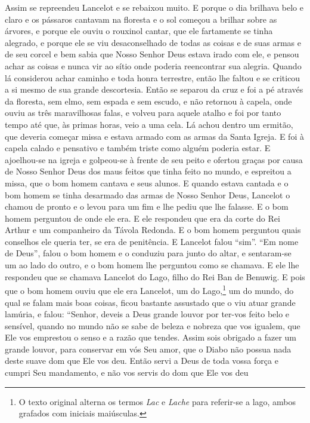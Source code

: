 Assim se repreendeu Lancelot e se rebaixou muito. E porque o dia brilhava belo
e claro e os pássaros cantavam na floresta e o sol começou a brilhar sobre as
árvores, e porque ele ouviu o rouxinol cantar, que ele fartamente se tinha
alegrado, e porque ele se viu desaconselhado de todas as coisas e de suas armas
e de seu corcel e bem sabia que Nosso Senhor Deus estava irado com ele, e
pensou achar as coisas e nunca vir ao sítio onde poderia reencontrar sua
alegria. Quando lá considerou achar caminho e toda honra terrestre,
então lhe faltou e se criticou a si mesmo de sua grande descortesia. 
Então se separou da cruz e foi a pé através da floresta, sem elmo, sem
espada e sem escudo, e não retornou à capela, onde ouviu as três maravilhosas
falas, e volveu para aquele atalho e foi por tanto tempo até que, às primas
horas, veio a uma cela. Lá achou dentro um ermitão, que deveria começar missa e
estava armado com as armas da Santa Igreja. E foi à capela calado e pensativo e
também triste como alguém poderia estar. E ajoelhou-se na igreja e golpeou-se à
frente de seu peito e ofertou graças por causa de Nosso Senhor Deus dos maus
feitos que tinha feito no mundo, e espreitou a missa, que o bom homem cantava e
seus alunos. E quando estava cantada e o bom homem se tinha desarmado das armas
de Nosso Senhor Deus, Lancelot o chamou de pronto e o levou para um fim e lhe
pediu que lhe falasse. E o bom homem perguntou de onde ele era. E ele respondeu
que era da corte do Rei Arthur e um companheiro da Távola Redonda. E o bom homem
perguntou quais conselhos ele queria ter, se era de penitência. E Lancelot
falou “sim”. “Em nome de Deus”, falou o bom homem e o conduziu para junto do
altar, e sentaram-se um ao lado do outro, e o bom homem lhe perguntou como se
chamava. E ele lhe respondeu que se chamava Lancelot do Lago, filho do Rei Ban
de Benuwig. E pois que o bom homem ouviu que ele era Lancelot, um do
Lago,\footnote{ O texto original alterna os termos \textit{Lac }e \textit{Lache}
para referir-se a lago, ambos grafados com iniciais maiúsculas.} 
um do mundo, do qual se falam mais boas coisas, ficou bastante assustado que o
viu atuar grande lamúria, e falou: “Senhor, deveis a Deus grande louvor por
ter-vos feito belo e sensível, quando no mundo não se sabe de beleza e nobreza
que vos igualem, que Ele vos emprestou o senso e a razão que tendes. Assim sois
obrigado a fazer um grande louvor, para conservar em vós Seu amor,  que o Diabo
não possua nada deste suave dom que Ele vos deu. Então servi a Deus de toda
vossa força e cumpri Seu mandamento, e não vos servis do dom que Ele vos deu
